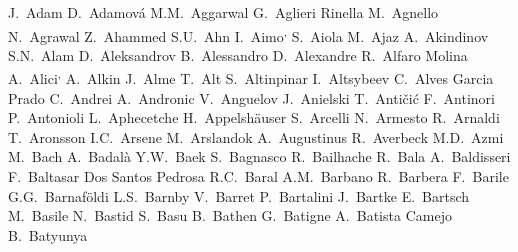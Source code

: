 


\begingroup
\small
\begin{flushleft}
J.~Adam\And
D.~Adamov\'{a}\And
M.M.~Aggarwal\And
G.~Aglieri Rinella\And
M.~Agnello\And
N.~Agrawal\And
Z.~Ahammed\And
S.U.~Ahn\And
I.~Aimo\textsuperscript{,}\And
S.~Aiola\And
M.~Ajaz\And
A.~Akindinov\And
S.N.~Alam\And
D.~Aleksandrov\And
B.~Alessandro\And
D.~Alexandre\And
R.~Alfaro Molina\And
A.~Alici\textsuperscript{,}\And
A.~Alkin\And
J.~Alme\And
T.~Alt\And
S.~Altinpinar\And
I.~Altsybeev\And
C.~Alves Garcia Prado\And
C.~Andrei\And
A.~Andronic\And
V.~Anguelov\And
J.~Anielski\And
T.~Anti\v{c}i\'{c}\And
F.~Antinori\And
P.~Antonioli\And
L.~Aphecetche\And
H.~Appelsh\"{a}user\And
S.~Arcelli\And
N.~Armesto\And
R.~Arnaldi\And
T.~Aronsson\And
I.C.~Arsene\And
M.~Arslandok\And
A.~Augustinus\And
R.~Averbeck\And
M.D.~Azmi\And
M.~Bach\And
A.~Badal\`{a}\And
Y.W.~Baek\And
S.~Bagnasco\And
R.~Bailhache\And
R.~Bala\And
A.~Baldisseri\And
F.~Baltasar Dos Santos Pedrosa\And
R.C.~Baral\And
A.M.~Barbano\And
R.~Barbera\And
F.~Barile\And
G.G.~Barnaf\"{o}ldi\And
L.S.~Barnby\And
V.~Barret\And
P.~Bartalini\And
J.~Bartke\And
E.~Bartsch\And
M.~Basile\And
N.~Bastid\And
S.~Basu\And
B.~Bathen\And
G.~Batigne\And
A.~Batista Camejo\And
B.~Batyunya\And

\end{flushleft}
